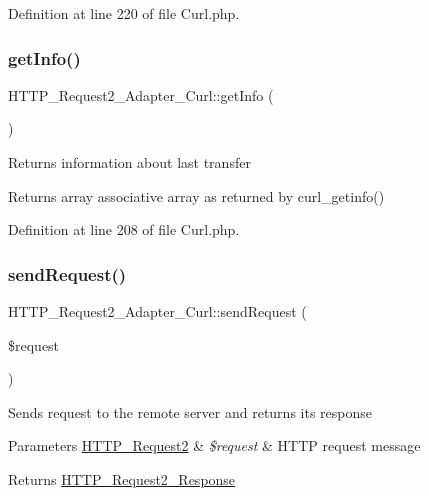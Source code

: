 Definition at line 220 of file Curl.\+php.

\mbox{\label{classHTTP__Request2__Adapter__Curl_a9c8c318ec7a6314f235ef4dfea89e6b2}} 
\subsubsection{\texorpdfstring{get\+Info()}{getInfo()}}
{\footnotesize\ttfamily H\+T\+T\+P\+\_\+\+Request2\+\_\+\+Adapter\+\_\+\+Curl\+::get\+Info (\begin{DoxyParamCaption}{ }\end{DoxyParamCaption})}

Returns information about last transfer

\begin{DoxyReturn}{Returns}
array associative array as returned by curl\+\_\+getinfo() 
\end{DoxyReturn}


Definition at line 208 of file Curl.\+php.

\mbox{\label{classHTTP__Request2__Adapter__Curl_a9da450eb1bb1492d1b39c22c2f29bb2b}} 
\subsubsection{\texorpdfstring{send\+Request()}{sendRequest()}}
{\footnotesize\ttfamily H\+T\+T\+P\+\_\+\+Request2\+\_\+\+Adapter\+\_\+\+Curl\+::send\+Request (\begin{DoxyParamCaption}\item[{\hyperlink{classHTTP__Request2}{H\+T\+T\+P\+\_\+\+Request2}}]{\$request }\end{DoxyParamCaption})}

Sends request to the remote server and returns its response


\begin{DoxyParams}[1]{Parameters}
\hyperlink{classHTTP__Request2}{H\+T\+T\+P\+\_\+\+Request2} & {\em \$request} & H\+T\+TP request message\\
\hline
\end{DoxyParams}
\begin{DoxyReturn}{Returns}
\hyperlink{classHTTP__Request2__Response}{H\+T\+T\+P\+\_\+\+Request2\+\_\+\+Response} 
\end{DoxyReturn}

